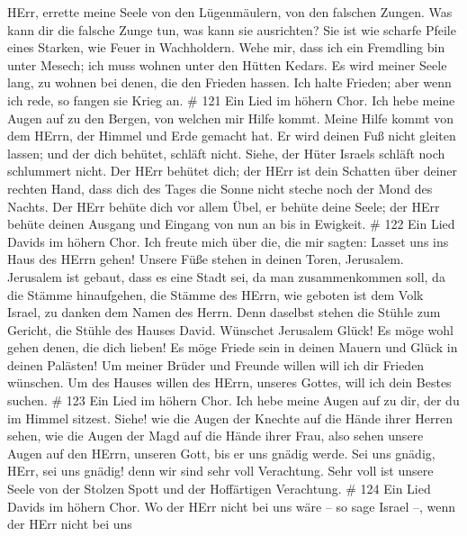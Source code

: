  HErr, errette meine Seele von den Lügenmäulern, von den
falschen Zungen.  Was kann dir die falsche Zunge tun, was
kann sie ausrichten?  Sie ist wie scharfe Pfeile eines
Starken, wie Feuer in Wachholdern.  Wehe mir, dass ich ein
Fremdling bin unter Mesech; ich muss wohnen unter den Hütten Kedars.
 Es wird meiner Seele lang, zu wohnen bei denen, die den
Frieden hassen.  Ich halte Frieden; aber wenn ich rede, so
fangen sie Krieg an. \# 121  Ein Lied im höhern Chor. Ich
hebe meine Augen auf zu den Bergen, von welchen mir Hilfe kommt.
 Meine Hilfe kommt von dem HErrn, der Himmel und Erde
gemacht hat.  Er wird deinen Fuß nicht gleiten lassen; und
der dich behütet, schläft nicht.  Siehe, der Hüter Israels
schläft noch schlummert nicht.  Der HErr behütet dich; der
HErr ist dein Schatten über deiner rechten Hand,  dass dich
des Tages die Sonne nicht steche noch der Mond des Nachts. 
Der HErr behüte dich vor allem Übel, er behüte deine Seele; 
der HErr behüte deinen Ausgang und Eingang von nun an bis in Ewigkeit.
\# 122  Ein Lied Davids im höhern Chor. Ich freute mich über
die, die mir sagten: Lasset uns ins Haus des HErrn gehen! 
Unsere Füße stehen in deinen Toren, Jerusalem.  Jerusalem
ist gebaut, dass es eine Stadt sei, da man zusammenkommen soll,
 da die Stämme hinaufgehen, die Stämme des HErrn, wie
geboten ist dem Volk Israel, zu danken dem Namen des Herrn. 
Denn daselbst stehen die Stühle zum Gericht, die Stühle des Hauses
David.  Wünschet Jerusalem Glück! Es möge wohl gehen denen,
die dich lieben!  Es möge Friede sein in deinen Mauern und
Glück in deinen Palästen!  Um meiner Brüder und Freunde
willen will ich dir Frieden wünschen.  Um des Hauses willen
des HErrn, unseres Gottes, will ich dein Bestes suchen. \# 123
 Ein Lied im höhern Chor. Ich hebe meine Augen auf zu dir,
der du im Himmel sitzest.  Siehe! wie die Augen der Knechte
auf die Hände ihrer Herren sehen, wie die Augen der Magd auf die Hände
ihrer Frau, also sehen unsere Augen auf den HErrn, unseren Gott, bis er
uns gnädig werde.  Sei uns gnädig, HErr, sei uns gnädig!
denn wir sind sehr voll Verachtung.  Sehr voll ist unsere
Seele von der Stolzen Spott und der Hoffärtigen Verachtung. \# 124
 Ein Lied Davids im höhern Chor. Wo der HErr nicht bei uns
wäre -- so sage Israel --,  wenn der HErr nicht bei uns
